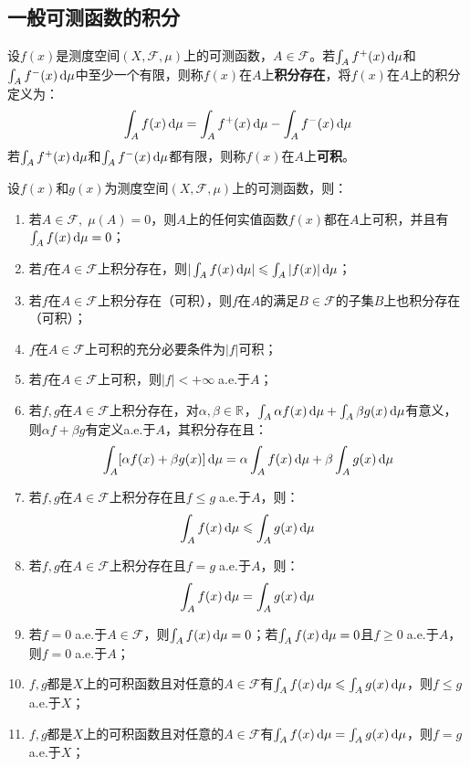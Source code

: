 \subsection{一般可测函数的积分}
\begin{definition}
	设$f(x)$是测度空间$(X,\mathscr{F},\mu)$上的可测函数，$A\in \mathscr{F}$。若$\int_{A}f^+(x)\mathop{}\!\mathrm{d}\mu$和$\int_{A}f^-(x)\mathop{}\!\mathrm{d}\mu$中至少一个有限，则称$f(x)$在$A$上\textbf{积分存在}，将$f(x)$在$A$上的积分定义为：
	\begin{equation*}
		\int_{A}f(x)\mathop{}\!\mathrm{d}\mu=\int_{A}f^+(x)\mathop{}\!\mathrm{d}\mu-\int_{A}f^-(x)\mathop{}\!\mathrm{d}\mu
	\end{equation*}
	若$\int_{A}f^+(x)\mathop{}\!\mathrm{d}\mu$和$\int_{A}f^-(x)\mathop{}\!\mathrm{d}\mu$都有限，则称$f(x)$在$A$上\textbf{可积}。
\end{definition}
\begin{property}\label{prop:MeasurableIntegral}
	设$f(x)$和$g(x)$为测度空间$(X,\mathscr{F},\mu)$上的可测函数，则：
	\begin{enumerate}
		\item 若$A\in \mathscr{F},\;\mu(A)=0$，则$A$上的任何实值函数$f(x)$都在$A$上可积，并且有$\int_{A}f(x)\mathop{}\!\mathrm{d}\mu=0$；
		\item 若$f$在$A\in \mathscr{F}$上积分存在，则$|\int_{A}^{}f(x)\mathop{}\!\mathrm{d}\mu|\leqslant\int_{A}^{}|f(x)|\mathop{}\!\mathrm{d}\mu$；
		\item 若$f$在$A\in \mathscr{F}$上积分存在（可积），则$f$在$A$的满足$B\in\mathscr{F}$的子集$B$上也积分存在（可积）；
		\item $f$在$A\in \mathscr{F}$上可积的充分必要条件为$|f|$可积；
		\item 若$f$在$A\in\mathscr{F}$上可积，则$|f|<+\infty\;$a.e.于$A$；
		\item 若$f,g$在$A\in \mathscr{F}$上积分存在，对$\alpha,\beta\in\mathbb{R}^{}$，$\int_{A}^{}\alpha f(x)\mathop{}\!\mathrm{d}\mu+\int_{A}^{}\beta g(x)\mathop{}\!\mathrm{d}\mu$有意义，则$\alpha f+\beta g$有定义a.e.于$A$，其积分存在且：
		\begin{equation*}
			\int_{A}^{}[\alpha f(x)+\beta g(x)]\mathop{}\!\mathrm{d}\mu=\alpha\int_{A}^{}f(x)\mathop{}\!\mathrm{d}\mu+\beta\int_{A}^{}g(x)\mathop{}\!\mathrm{d}\mu
		\end{equation*}
		\item 若$f,g$在$A\in\mathscr{F}$上积分存在且$f\leqslant g\;$a.e.于$A$，则：
		\begin{equation*}
			\int_{A}^{}f(x)\mathop{}\!\mathrm{d}\mu\leqslant\int_{A}^{}g(x)\mathop{}\!\mathrm{d}\mu
		\end{equation*}
		\item 若$f,g$在$A\in\mathscr{F}$上积分存在且$f=g\;$a.e.于$A$，则：
		\begin{equation*}
			\int_{A}^{}f(x)\mathop{}\!\mathrm{d}\mu=\int_{A}^{}g(x)\mathop{}\!\mathrm{d}\mu
		\end{equation*}
		\item 若$f=0\;$a.e.于$A\in \mathscr{F}$，则$\int_{A}^{}f(x)\mathop{}\!\mathrm{d}\mu=0$；若$\int_{A}^{}f(x)\mathop{}\!\mathrm{d}\mu=0$且$f\geqslant0\;$a.e.于$A$，则$f=0\;$a.e.于$A$；
		\item $f,g$都是$X$上的可积函数且对任意的$A\in \mathscr{F}$有$\int_{A}^{}f(x)\mathop{}\!\mathrm{d}\mu\leqslant\int_{A}^{}g(x)\mathop{}\!\mathrm{d}\mu$，则$f\leqslant g\;$a.e.于$X$；
		\item $f,g$都是$X$上的可积函数且对任意的$A\in \mathscr{F}$有$\int_{A}^{}f(x)\mathop{}\!\mathrm{d}\mu=\int_{A}^{}g(x)\mathop{}\!\mathrm{d}\mu$，则$f=g\;$a.e.于$X$；
	\end{enumerate}
\end{property}
